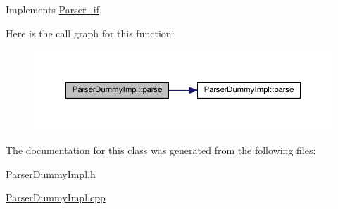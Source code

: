 Implements \hyperlink{class_parser__if_af163b0c5b081ccfa2ba04267cd4741b1}{Parser\+\_\+if}.



Here is the call graph for this function\+:\nopagebreak
\begin{figure}[H]
\begin{center}
\leavevmode
\includegraphics[width=350pt]{class_parser_dummy_impl_a7e26c2710c8da73807a3800223d01412_cgraph}
\end{center}
\end{figure}




The documentation for this class was generated from the following files\+:\begin{DoxyCompactItemize}
\item 
\hyperlink{_parser_dummy_impl_8h}{Parser\+Dummy\+Impl.\+h}\item 
\hyperlink{_parser_dummy_impl_8cpp}{Parser\+Dummy\+Impl.\+cpp}\end{DoxyCompactItemize}
